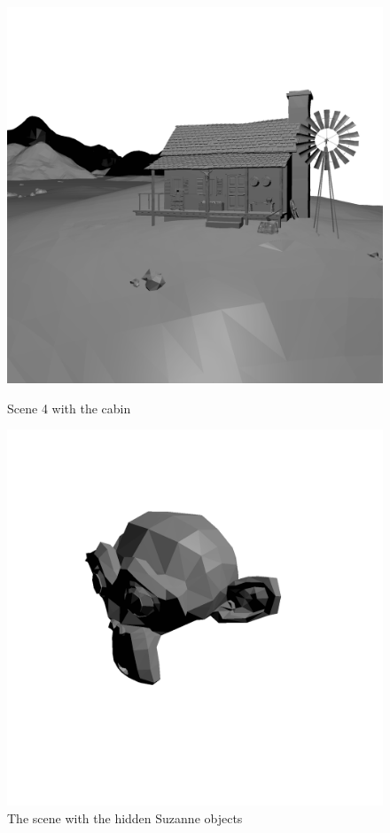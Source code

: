 \documentclass{vgtc}
\begin{document}
\begin{figure}[!htb]
%
  \includegraphics[width=\linewidth]{cabin.png}
  \caption{Scene 4 with the cabin}\label{fig:cabin_scene}
\endminipage
{}
  \includegraphics[width=\linewidth]{suzanne.png}
  \caption{The scene with the hidden Suzanne objects}\label{fig:suzanne_scene}
\endminipage\hfill
\end{figure}
\end{document}
